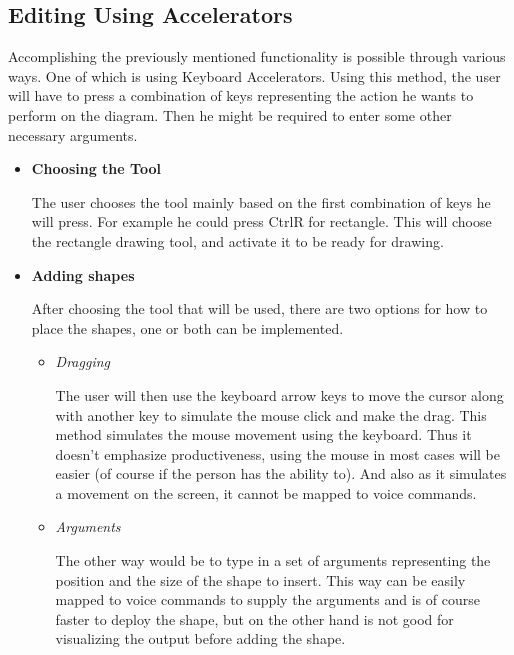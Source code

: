 \subsection{Editing Using Accelerators}
\par \noindent
Accomplishing the previously mentioned functionality is possible through various ways. One of which is using Keyboard Accelerators. Using this method, the user will have to press a combination of keys representing the action he wants to perform on the diagram. Then he might be required to enter some other necessary arguments.

\begin{itemize}
\item {\bf Choosing the Tool}
\par \noindent
The user chooses the tool mainly based on the first combination of keys he will press. For example he could press CtrlR for rectangle. This will choose the rectangle drawing tool, and activate it to be ready for drawing.

\item {\bf Adding shapes}
\par \noindent
After choosing the tool that will be used, there are two options for how to place the shapes, one or both can be implemented.
	\begin{itemize}
	\item {\it Dragging}
	\par \noindent
	The user will then use the keyboard arrow keys to move the cursor along with another key to simulate the mouse click and make the drag. This method simulates the mouse movement using the keyboard. Thus it doesn't emphasize productiveness, using the mouse in most cases will be easier (of course if the person has the ability to). And also as it simulates a movement on the screen, it cannot be mapped to voice commands.
	
	\item {\it Arguments}
	\par \noindent
	The other way would be to type in a set of arguments representing the position and the size of the shape to insert. This way can be easily mapped to voice commands to supply the arguments and is of course faster to deploy the shape, but on the other hand is not good for visualizing the output before adding the shape.
	\end{itemize}


\end{itemize}
